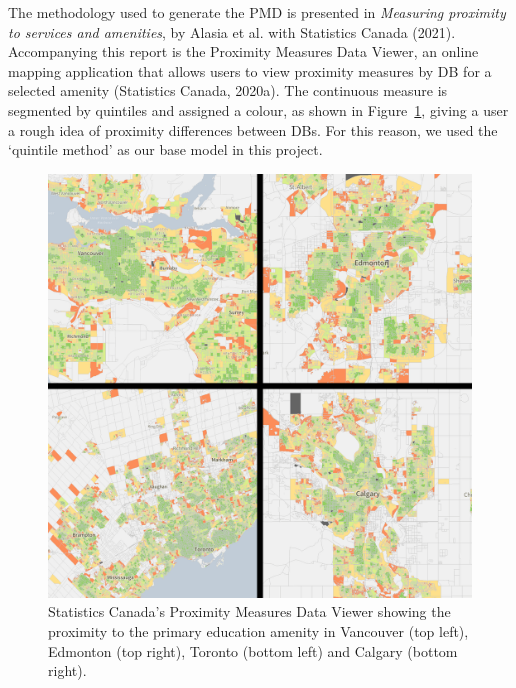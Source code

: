 \documentclass[11pt, a4paper]{article}
\begin{document}
The methodology used to generate the PMD is presented in \textit{Measuring proximity to services and amenities}, by Alasia et al. with Statistics Canada (2021). Accompanying this report is the Proximity Measures Data Viewer, an online mapping application that allows users to view proximity measures by DB for a selected amenity (Statistics Canada, 2020a). The continuous measure is segmented by quintiles and assigned a colour, as shown in Figure~\ref{pmdviewer}, giving a user a rough idea of proximity differences between DBs. For this reason, we used the `quintile method' as our base model in this project.



\begin{figure}[H]
\centering
\includegraphics[width=\textwidth]{./PMD_viewer/PMD_viewer2.png}
\caption[Proximity Measures Data Viewer]{Statistics Canada’s Proximity Measures Data Viewer showing the proximity to the primary education amenity in Vancouver (top left), Edmonton (top right), Toronto (bottom left) and Calgary (bottom right).}\label{pmdviewer}
\end{figure}
\end{document}
